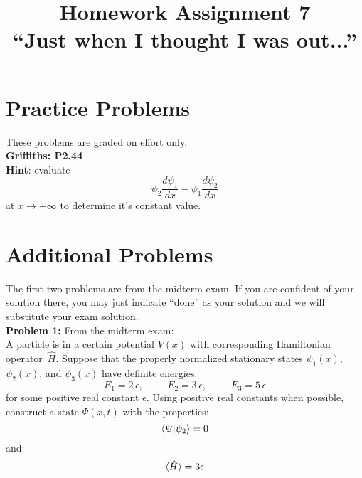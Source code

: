 \documentclass[12pt]{article}
\begin{document}
\newcommand{\ihbar}{\ensuremath{i \hbar}}
\newcommand{\dPsidt}{\ensuremath{ \frac{\partial \Psi}{\partial t} }}
\newcommand{\dPsidx}{\ensuremath{ \frac{\partial \Psi}{\partial x} }}
\newcommand{\ddPsidx}{\ensuremath{ \frac{\partial^2 \Psi}{\partial x^2} }}
\newcommand{\dPssdt}{\ensuremath{ \frac{\partial \Psi^*}{\partial t} }}
\newcommand{\dPssdx}{\ensuremath{ \frac{\partial \Psi^*}{\partial x} }}
\newcommand{\ddPssdx}{\ensuremath{ \frac{\partial^2 \Psi^*}{\partial x^2} }}

\newcommand{\dphidt}{\ensuremath{ \frac{d \phi}{dt} }}
\newcommand{\dpsidx}{\ensuremath{ \frac{d \psi}{dx} }}
\newcommand{\ddpsidx}{\ensuremath{ \frac{d^2 \psi}{dx^2} }}


\date{\vspace{-5ex}}

\title{Homework Assignment 7 \\ ``Just when I thought I was out...''}

\maketitle

\section*{Practice Problems}

These problems are graded on effort only.\\

\noindent
{\bf Griffiths: P2.44} \\[5pt]
{\bf Hint}: evaluate
$$\psi_2\frac{d\psi_1}{dx} - \psi_1\frac{d\psi_2}{dx}$$
at $x \to +\infty$ to determine it's constant value.
  
\section*{Additional Problems}

The first two problems are from the midterm exam.  If you are confident of
your solution there, you may just indicate ``done'' as your solution and we will substitute your exam solution.\\

\noindent
{\bf Problem 1:}  From the midterm exam:\\

A particle is in a certain potential $V(x)$ with corresponding Hamiltonian operator~$\hat{H}$.  Suppose that the properly normalized stationary states $\psi_1(x)$, $\psi_2(x)$, and $\psi_3(x)$ have definite energies:
$$E_1=2\,\epsilon, \hspace{1cm} E_2=3\,\epsilon, \hspace{1cm} E_3=5\,\epsilon$$
for some positive real constant $\epsilon$.  Using positive real constants when possible, construct a state $\Psi(x,t)$ with the properties:
$$\braket{\Psi|\psi_2} = 0$$
and:
$$\braket{\hat{H}} = 3\epsilon$$
\end{document}
